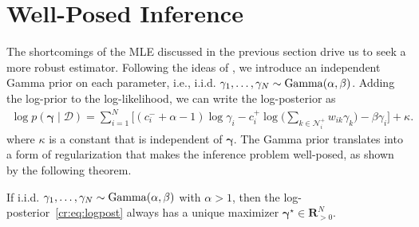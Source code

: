 \section{Well-Posed Inference} %
\label{cr:sec:inference}

The shortcomings of the MLE discussed in the previous section drive us to seek a more robust estimator.
Following the ideas of \citet{caron2012efficient}, we introduce an independent Gamma prior on each parameter, i.e., i.i.d. $\gamma_1, \ldots, \gamma_N \sim \mathrm{Gamma}( \alpha, \beta )$.
Adding the log-prior to the log-likelihood, we can write the log-posterior as
\begin{align}
\label{cr:eq:logpost}
\log p(\bm{\gamma} \mid \mathcal{D}) =
    \sum_{i = 1}^N \bigg[ (c^-_i + \alpha - 1) \log \gamma_i
        - c^+_i \log \bigg( \sum_{k \in \mathcal{N}^+_i} w_{ik} \gamma_k \bigg)  - \beta \gamma_i \bigg]
    + \kappa.
\end{align}
where $\kappa$ is a constant that is independent of $\bm{\gamma}$.
The Gamma prior translates into a form of regularization that makes the inference problem well-posed, as shown by the following theorem.

\begin{theorem}
\label{cr:thm:map}
If i.i.d. $\gamma_1, \ldots, \gamma_N \sim \mathrm{Gamma}( \alpha, \beta )$ with $\alpha > 1$, then the log-posterior~\eqref{cr:eq:logpost} always has a unique maximizer $\bm{\gamma}^\star \in \mathbf{R}^N_{>0}$.
\end{theorem}

